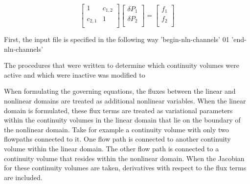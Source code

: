   \begin{equation}
\label{eqn:domainDecomp5}
 \begin{bmatrix} 
1 & c_{1,2}  \\
c_{2,1} & 1 \\
 \end{bmatrix} \begin{bmatrix}
 \delta P_{1} \\
 \delta P_{2} \\
\end{bmatrix}  = \begin{bmatrix}
 f_1 \\
 f_2 \\
\end{bmatrix}
 \end{equation}
 

First, the input file is specified in the following way 
'begin-nln-channels'
01
'end-nln-channels'


The procedures that were written to determine which continuity volumes were active and which were inactive was modified to 

When formulating the governing equations, the fluxes between the linear and nonlinear domains are treated as additional nonlinear variables.
When the linear domain is formulated, these flux terms are treated as variational parameters within the continuity volumes in the linear domain that lie on the boundary of the nonlinear domain.
Take for example a continuity volume with only two flowpaths connected to it.
One flow path is connected to another continuity volume within the linear domain.
The other flow path is connected to a continuity volume that resides within the nonlinear domain.
When the Jacobian for these continuity volumes are taken, derivatives with respect to the flux terms are included.

